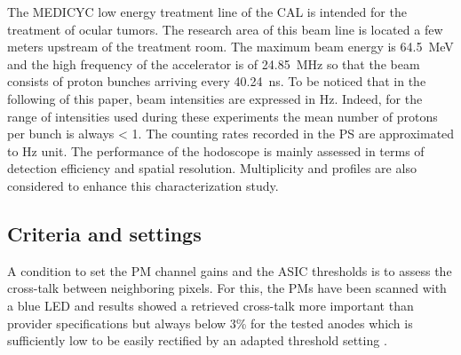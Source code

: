\documentclass[a4paper,11pt]{article}
\begin{document}
The MEDICYC low energy treatment line of the CAL is intended for the treatment of ocular tumors. The research area of this beam line is located a few meters upstream of the treatment room. The maximum beam energy is 64.5~MeV and the high frequency of the accelerator is of 24.85~MHz so that the beam consists of proton bunches arriving every 40.24~ns. To be noticed that in the following of this paper, beam intensities are expressed in Hz. Indeed, for the range of intensities used during these experiments the mean number of protons per bunch is always < 1. The counting rates recorded in the PS are approximated to Hz unit.
The performance of the hodoscope is mainly assessed in terms of detection efficiency and spatial resolution. Multiplicity and profiles are also considered to enhance this characterization study.

\subsection{Criteria and settings}
\label{Settings}
A condition to set the PM channel gains and the ASIC thresholds is to assess the cross-talk between neighboring pixels. For this, the PMs have been scanned with a blue LED and results showed a retrieved cross-talk more important than provider specifications but always below 3\% for the tested anodes which is sufficiently low to be easily rectified by an adapted threshold setting \cite{FontanaPhD}.
\end{document}
